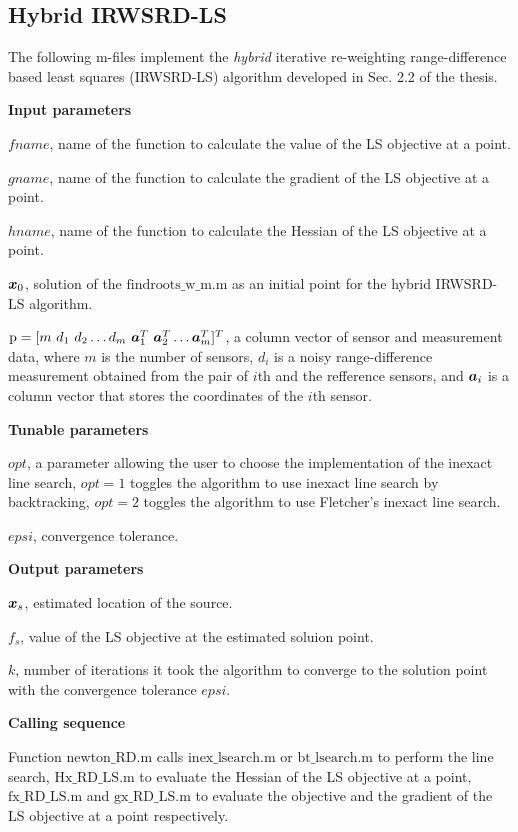 \subsection{Hybrid IRWSRD-LS}

The following m-files implement the \textit{hybrid} iterative re-weighting range-difference based least squares (IRWSRD-LS) algorithm developed in Sec. 2.2 of the thesis. 

\phantom{m}

\noindent
\textbf{Input parameters}

\noindent
$fname$, name of the function to calculate the value of the LS objective at a point.

\noindent
$gname$, name of the function to calculate the gradient of the LS objective at a point.

\noindent
$hname$, name of the function to calculate the Hessian of the LS objective at a point.


\noindent
$\mbox{\boldmath$x$}_0$, solution of the $\mbox{findroots\_w\_m.m}$ as an initial point for the hybrid IRWSRD-LS algorithm.


\noindent
$\mbox{p} = [m \ d_1 \ d_2 \ldots d_m \ \Ba_1^T \ \Ba_2^T \ldots \Ba_m^T]^T$, a column vector of sensor and measurement data, where $m$ is the number of sensors, $d_i$ is a noisy range-difference measurement obtained from the pair of $i$th and the refference sensors, and $\mbox{\boldmath$a$}_i$ is a column vector that stores the coordinates of the $i$th sensor.


\noindent
\textbf{Tunable parameters}

\noindent
$opt$, a parameter allowing the user to choose the implementation of the inexact line search, $opt = 1$ toggles the algorithm to use inexact line search by backtracking, $opt = 2$ toggles the algorithm to use Fletcher's inexact line search.

\noindent
$epsi$, convergence tolerance.

\noindent
\textbf{Output parameters}

\noindent
$\mbox{\boldmath$x$}_s$, estimated location of the source.

\noindent
$f_s$, value of the LS objective at the estimated soluion point.

\noindent
$k$, number of iterations it took the algorithm to  converge to the solution point with the convergence tolerance $epsi$.

\noindent
\textbf{Calling sequence}

\noindent
Function $\mbox{newton\_RD.m}$ calls $\mbox{inex\_lsearch.m}$ or $\mbox{bt\_lsearch.m}$ to perform the line search, $\mbox{Hx\_RD\_LS.m}$ to evaluate the Hessian of the LS objective at a point, $\mbox{fx\_RD\_LS.m}$ and $\mbox{gx\_RD\_LS.m}$ to evaluate the objective and the gradient of the LS objective at a point respectively.  


